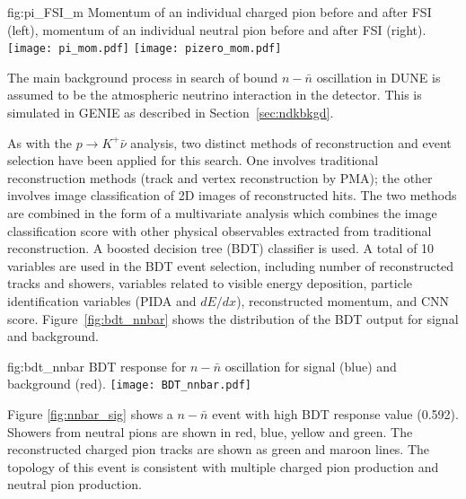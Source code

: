 \begin{dunefigure}
{fig:pi_FSI_m}
{Momentum of an individual charged pion before and after FSI (left), momentum of an individual neutral pion before and after FSI (right).}
\texttt{[image: pi\_mom.pdf]}
\texttt{[image: pizero\_mom.pdf]}
\end{dunefigure} 

The main background process in search of bound $n-\bar{n}$ oscillation in DUNE is assumed to be the atmospheric neutrino interaction in the detector.  This is simulated in GENIE as described in Section~\ref{sec:ndkbkgd}.

As with the $p\rightarrow K^{+} \bar{\nu}$ analysis, two distinct methods of reconstruction and event selection have been applied for this search. One involves traditional reconstruction methods (\threed track and vertex reconstruction by PMA); the other involves image classification 
of 2D images of reconstructed hits. The two methods are combined in the form of a multivariate analysis which combines the image classification score with other physical observables extracted from traditional reconstruction.  A boosted decision tree (BDT) classifier is used. A total of 10 variables are used in the BDT event selection, including number of reconstructed tracks and showers, variables related to visible energy deposition, particle identification variables (PIDA and $dE/dx$), reconstructed momentum, and CNN score.  Figure~\ref{fig:bdt_nnbar} shows the distribution of the BDT output for signal and background.

\begin{dunefigure}
{fig:bdt_nnbar}
{BDT response for $n-\bar{n}$ oscillation for signal (blue) and background (red).}
\texttt{[image: BDT\_nnbar.pdf]}
\end{dunefigure} 


Figure \ref{fig:nnbar_sig} shows a $n-\bar{n}$ event with high BDT response value (0.592). Showers from neutral pions are shown in red, blue, yellow and green. The reconstructed charged pion tracks are shown as green and maroon lines. The topology of this event is consistent with multiple charged pion production and neutral pion production. 


